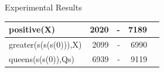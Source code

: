 \documentclass[pdf,slideColor,contemporain]{prosper}
\begin{document}
\begin{slide}{Experimental Results}
\begin{tiny}
\begin{table}[t]
\begin{tabular}{||l|r|r|r|r||}
positive(X)                  &  2020      &  -       &  7189   &          \\ 
\hline %
greater(s(s(s(0))),X)        &  2099      &  -       &  6990   &          \\ 
\hline %
queens(s(s(0)),Qs)           &  6939      &  -       &  9119   &          \\ 

\hline %
\hline %

\end{tabular}

\end{table}
 

\end{tiny}

\end{slide}

\end{document}

